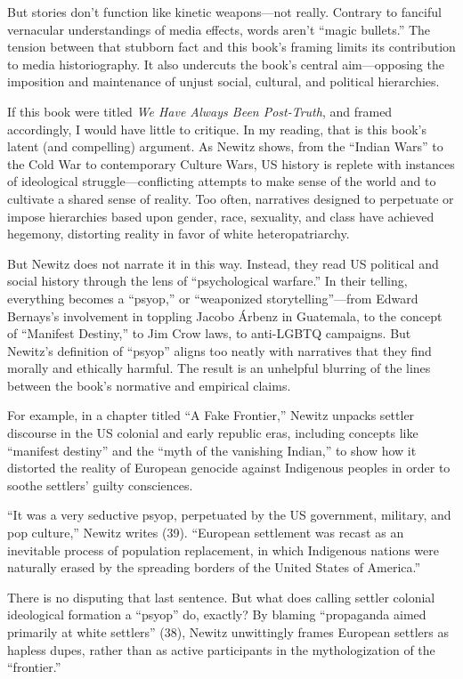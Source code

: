 \documentclass{tufte-handout}
\begin{document}
But stories don't function like kinetic weapons---not really. Contrary
to fanciful vernacular understandings of media effects, words aren't
``magic bullets.'' The tension between that stubborn fact and this
book's framing limits its contribution to media historiography. It also
undercuts the book's central aim---opposing the imposition and
maintenance of unjust social, cultural, and political hierarchies.

If this book were titled \emph{We Have Always Been Post-Truth}, and
framed accordingly, I would have little to critique. In my reading, that
is this book's latent (and compelling) argument. As Newitz shows, from
the ``Indian Wars'' to the Cold War to contemporary Culture Wars, US
history is replete with instances of ideological struggle---conflicting
attempts to make sense of the world and to cultivate a shared sense of
reality. Too often, narratives designed to perpetuate or impose
hierarchies based upon gender, race, sexuality, and class have achieved
hegemony, distorting reality in favor of white heteropatriarchy.

But Newitz does not narrate it in this way. Instead, they read US
political and social history through the lens of ``psychological
warfare.'' In their telling, everything becomes a ``psyop,'' or
``weaponized storytelling''---from Edward Bernays's involvement in
toppling Jacobo Árbenz in Guatemala, to the concept of ``Manifest
Destiny,'' to Jim Crow laws, to anti-LGBTQ campaigns. But Newitz's
definition of ``psyop'' aligns too neatly with narratives that they find
morally and ethically harmful. The result is an unhelpful blurring of
the lines between the book's normative and empirical claims.

For example, in a chapter titled ``A Fake Frontier,'' Newitz unpacks
settler discourse in the US colonial and early republic eras, including
concepts like ``manifest destiny'' and the ``myth of the vanishing
Indian,'' to show how it distorted the reality of European genocide
against Indigenous peoples in order to soothe settlers' guilty
consciences.

\newpage ``It was a very seductive psyop, perpetuated by the US government,
military, and pop culture,'' Newitz writes (39). ``European settlement
was recast as an inevitable process of population replacement, in which
Indigenous nations were naturally erased by the spreading borders of the
United States of America.''

There is no disputing that last sentence. But what does calling settler
colonial ideological formation a ``psyop'' do, exactly? By blaming
``propaganda aimed primarily at white settlers'' (38), Newitz
unwittingly frames European settlers as hapless dupes, rather than as
active participants in the mythologization of the ``frontier.''
\end{document}
